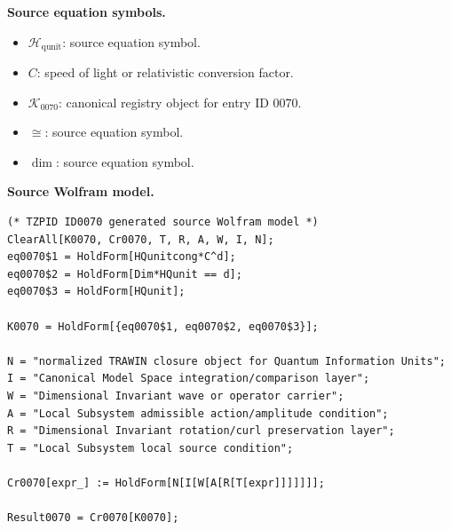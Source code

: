 \begin{minipage}[t]{0.49\linewidth}
\begingroup
\small
\raggedright
\textbf{Source equation symbols.}\par
\begin{itemize}[leftmargin=1.35em,itemsep=1pt,topsep=1pt,parsep=0pt]
    \item $\mathcal{H}_{\mathrm{qunit}}$: source equation symbol.
    \item $C$: speed of light or relativistic conversion factor.
    \item $\mathcal{K}_{0070}$: canonical registry object for entry ID 0070.
    \item $\cong$: source equation symbol.
    \item $\dim$: source equation symbol.
\end{itemize}
\endgroup
\end{minipage}\hfill
\begin{minipage}[t]{0.47\linewidth}
\begingroup
\scriptsize
\raggedright
\textbf{Source Wolfram model.}\par
\begin{Verbatim}[fontsize=\tiny,breaklines=true,breakanywhere=true]
(* TZPID ID0070 generated source Wolfram model *)
ClearAll[K0070, Cr0070, T, R, A, W, I, N];
eq0070$1 = HoldForm[HQunitcong*C^d];
eq0070$2 = HoldForm[Dim*HQunit == d];
eq0070$3 = HoldForm[HQunit];

K0070 = HoldForm[{eq0070$1, eq0070$2, eq0070$3}];

N = "normalized TRAWIN closure object for Quantum Information Units";
I = "Canonical Model Space integration/comparison layer";
W = "Dimensional Invariant wave or operator carrier";
A = "Local Subsystem admissible action/amplitude condition";
R = "Dimensional Invariant rotation/curl preservation layer";
T = "Local Subsystem local source condition";

Cr0070[expr_] := HoldForm[N[I[W[A[R[T[expr]]]]]]];

Result0070 = Cr0070[K0070];
\end{Verbatim}
\endgroup
\end{minipage}

